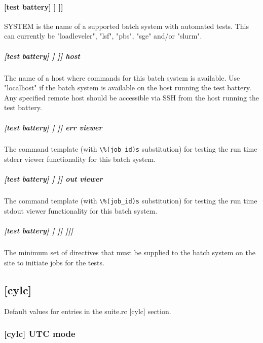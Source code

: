 \paragraph[{[[[}SYSTEM{]]]}]{[test battery] \textrightarrow [[batch systems]] \textrightarrow [[[SYSTEM]]]}

SYSTEM is the name of a supported batch system with automated tests.
This can currently be "loadleveler", "lsf", "pbs", "sge" and/or "slurm".

\subparagraph[host]{[test battery] \textrightarrow [[batch systems]] \textrightarrow [[[SYSTEM]]] \textrightarrow host}

The name of a host where commands for this batch system is available. Use
"localhost" if the batch system is available on the host running the test
battery. Any specified remote host should be accessible via SSH from the host
running the test battery.

\subparagraph[err viewer]{[test battery] \textrightarrow [[batch systems]] \textrightarrow [[[SYSTEM]]] \textrightarrow err viewer}

The command template (with \lstinline=\%(job_id)s= substitution) for testing
the run time stderr viewer functionality for this batch system.

\subparagraph[out viewer]{[test battery] \textrightarrow [[batch systems]] \textrightarrow [[[SYSTEM]]] \textrightarrow out viewer}

The command template (with \lstinline=\%(job_id)s= substitution) for testing
the run time stdout viewer functionality for this batch system.

\subparagraph[{[[[[}directives{]]]]}]{[test battery] \textrightarrow [[batch systems]] \textrightarrow [[[SYSTEM]]] \textrightarrow [[[[directives]]]]}

The minimum set of directives that must be supplied to the batch system on the
site to initiate jobs for the tests.

\subsection{[cylc]}

Default values for entries in the suite.rc [cylc] section.

\subsubsection[UTC mode]{[cylc] \textrightarrow UTC mode}
\label{SiteUTCMode}

